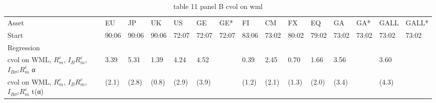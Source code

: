 \begin{table}[htbp]
  \centering
  \caption{table 11 panel B cvol on wml}
  \label{tab:table_11_panel_B_cvol_on_wml}
  \begin{tabular}{lllllllllllllll}
\toprule
Asset & EU & JP & UK & US & GE & GE* & FI & CM & FX & EQ & GA & GA* & GALL & GALL* \\
Start & 90:06 & 90:06 & 90:06 & 72:07 & 72:07 & 72:07 & 83:06 & 73:02 & 80:02 & 79:02 & 73:02 & 73:02 & 73:02 & 73:02 \\
Regression &  &  &  &  &  &  &  &  &  &  &  &  &  &  \\
\midrule
cvol on WML, $R^e_m$, $I_B R^e_m$, $I_{B\sigma^2} R^e_m$ α & 3.39 & 5.31 & 1.39 & 4.24 & 4.52 &  & 0.39 & 2.45 & 0.70 & 1.66 & 3.56 &  & 3.60 &  \\
cvol on WML, $R^e_m$, $I_B R^e_m$, $I_{B\sigma^2} R^e_m$ t(α) & (2.1) & (2.8) & (0.8) & (2.9) & (3.9) &  & (1.2) & (2.1) & (1.3) & (2.0) & (3.4) &  & (4.3) &  \\
\bottomrule
\end{tabular}

\end{table}
